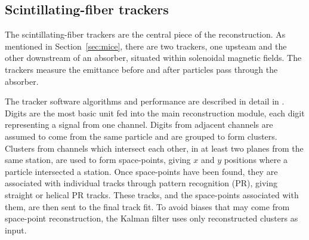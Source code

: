\documentclass[11pt,a4paper]{article}
\begin{document}
\subsection{Scintillating-fiber trackers}

The scintillating-fiber trackers are the central piece of the reconstruction. As mentioned in Section~\ref{sec:mice}, there are two trackers, one upsteam and the other downstream of an absorber, situated within solenoidal magnetic fields. The trackers measure the emittance before and after particles pass through the absorber.

The tracker software algorithms and performance are described in detail in \cite{TrackerSoftwareJINST}. Digits are the most basic unit fed into the main reconstruction module, each digit representing a signal from one channel. Digits from adjacent channels are assumed to come from the same particle and are grouped to form clusters. Clusters from channels which intersect each other, in at least two planes from the same station, are used to form space-points, giving $x$ and $y$ positions where a particle intersected a station. Once space-points have been found, they are associated with individual tracks through pattern recognition (PR), giving straight or helical PR tracks. These tracks, and the space-points associated with them, are then sent to the final track fit. To avoid biases that may come from space-point reconstruction, the Kalman filter uses only reconstructed clusters as input.
\end{document}
